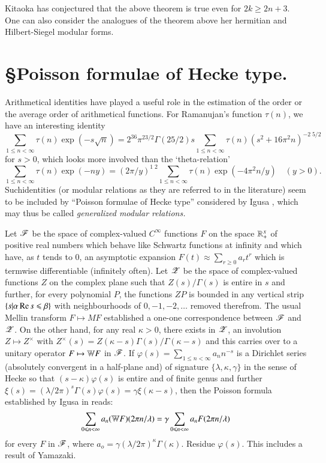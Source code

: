 Kitaoka \cite{art7-KI} has conjectured that the above theorem is true even for $2k \geqslant 2n +3 $. One can also consider the analogues of the theorem above her hermitian and Hilbert-Siegel modular forms. 

\section*{\S Poisson formulae of Hecke type.} 
Arithmetical identities have played a useful role in the estimation of the order or the average order of arithmetical functions. For Ramanujan's function $\tau(n)$, we have an interesting identity
$$
\sum\limits_{1\leqslant n <\infty} \tau (n) \exp (-s\sqrt{n}) = 2^{36} \pi^{23/2} \Gamma (25/2) s \sum\limits_{1 \leqslant n < \infty} \tau (n) (s^2 + 16 \pi^2n)^{-2 \;5/2} 
$$
for $s > 0$, which looks more involved than the `theta-relation'
$$
\sum\limits_{1 \leqslant n <\infty} \tau(n) \exp (-ny) = (2 \pi /y)^{1\; 2} \sum\limits_{1 \leqslant n < \infty} \tau (n) \exp (-4 \pi^2 n /y) \quad (y > 0).
$$ 
Such\pageoriginale identities (or modular relations as they are referred to in the literature) seem to be included by ``Poisson formulae of Hecke type'' considered by Igusa \cite{art7-I}, which may thus be called \textit{generalized modular relations.}

Let $\mathscr{F}$ be the space of complex-valued $C^\infty$ functions $F$ on the space $\mathbb{R}^x_+$ of positive real numbers which behave like Schwartz functions at infinity and which have, as $t$ tends to $0$, an asymptotic expansion $F(t) \approx \sum\limits_{r \geqslant 0} a_r t^r$ which is termwise differentiable (infinitely often). Let $\mathscr{Z}$ be the space of complex-valued functions $Z$ on the complex plane such that $Z(s)/\Gamma (s)$ is entire in $s$ and further, for every polynomial $P$, the functions $ZP$ is bounded in any vertical strip $\{s|\alpha \operatorname{Re} s \leqslant \beta\}$ with neighbourhoods of $0, -1, -2, \ldots$ removed therefrom. The usual Mellin transform $F \mapsto M F$ established a one-one correspondence between $\mathscr{F}$ and $\mathscr{Z}$. On the other hand, for any real $\kappa > 0$, there exists in $\mathscr{Z}$, an involution $Z \mapsto Z^\times$ with $Z^\times (s) = Z (\kappa -s)\Gamma (s) / \Gamma (\kappa -s)$ and this carries over to a unitary operator $F \mapsto \mathbb{W} F$ in $\mathscr{F}$. If $\varphi (s) = \sum\limits_{1 \leqslant n < \infty} a_n n^{-s}$ is a Dirichlet series  (absolutely convergent in a half-plane and) of signature $\{\lambda, \kappa, \gamma\}$ in the sense of Hecke \cite{art7-H2} so that $(s -\kappa) \varphi (s)$ is entire and of finite genus and further $\xi (s) =(\lambda / 2 \pi)^s \Gamma (s) \varphi (s) = \gamma \xi (\kappa -s)$, then the Poisson formula established by Igusa in \cite{art7-I} reads:
\begin{equation}
\sum\limits_{0\leqslant n < \infty} a_n (\mathbb{W} F)(2 \pi n /\lambda) = \gamma \sum\limits_{0 \leqslant n < \infty} a_n F (2 \pi n /\lambda) \label{art7-eq5}
\end{equation}
for every $F$ in $\mathscr{F}$, where $a_o = \gamma (\lambda/ 2 \pi)^\kappa \Gamma (\kappa)$. Residue $\varphi (s)$. This includes a result of Yamazaki.

